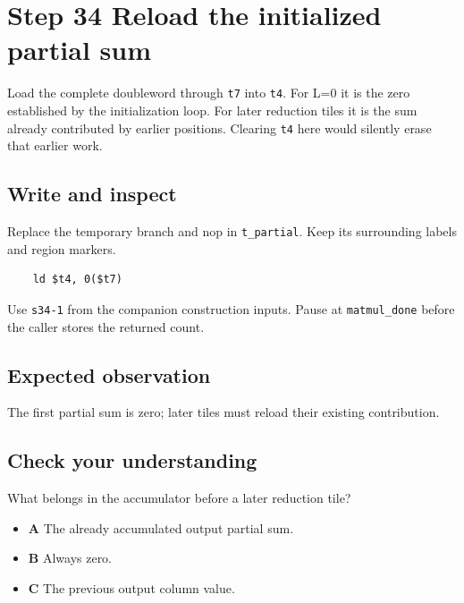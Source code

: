 \section{Step 34 Reload the initialized partial sum}\label{matmul-s34}

Load the complete doubleword through \texttt{t7} into \texttt{t4}. For L=0 it is the zero established by the initialization loop. For later reduction tiles it is the sum already contributed by earlier positions. Clearing \texttt{t4} here would silently erase that earlier work.

\subsection{Write and inspect}
Replace the temporary branch and nop in \texttt{t\_partial}. Keep its surrounding labels and region markers.

\begin{verbatim}
    ld $t4, 0($t7)
\end{verbatim}
Use \texttt{s34-1} from the companion construction inputs. Pause at \texttt{matmul\_done} before the caller stores the returned count.

\subsection{Expected observation}
The first partial sum is zero; later tiles must reload their existing contribution.

\subsection{Check your understanding}
What belongs in the accumulator before a later reduction tile?

\begin{itemize}
  \item \textbf{A} The already accumulated output partial sum.
  \item \textbf{B} Always zero.
  \item \textbf{C} The previous output column value.
\end{itemize}
